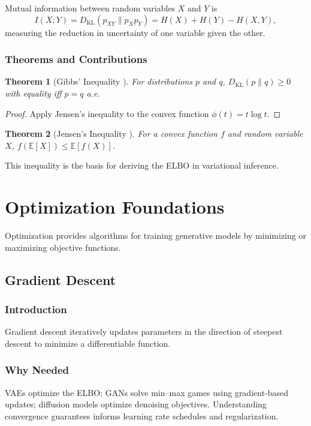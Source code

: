 \documentclass[11pt]{book}
\newtheorem{theorem}{Theorem}[chapter]
\begin{document}
Mutual information between random variables $X$ and $Y$ is
\begin{equation}
I(X;Y)=D_{\mathrm{KL}}(p_{XY}\|p_X p_Y)=H(X)+H(Y)-H(X,Y),
\end{equation}
measuring the reduction in uncertainty of one variable given the other.

\subsection{Theorems and Contributions}
\begin{theorem}[Gibbs' Inequality \cite{gibbs1873,shannon1948}]
For distributions $p$ and $q$, $D_{\mathrm{KL}}(p\|q)\ge0$ with equality iff $p=q$ a.e.
\end{theorem}
\begin{proof}
Apply Jensen's inequality to the convex function $\phi(t)=t\log t$.
\end{proof}

\begin{theorem}[Jensen's Inequality \cite{jensen1906}]
For a convex function $f$ and random variable $X$, $f(\mathbb{E}[X])\le\mathbb{E}[f(X)]$.
\end{theorem}
This inequality is the basis for deriving the ELBO in variational inference.

\chapter{Optimization Foundations}
Optimization provides algorithms for training generative models by minimizing or maximizing objective functions.

\section{Gradient Descent}
\subsection{Introduction}
Gradient descent iteratively updates parameters in the direction of steepest descent to minimize a differentiable function.

\subsection{Why Needed}
VAEs optimize the ELBO; GANs solve min--max games using gradient-based updates; diffusion models optimize denoising objectives. Understanding convergence guarantees informs learning rate schedules and regularization.
\end{document}
